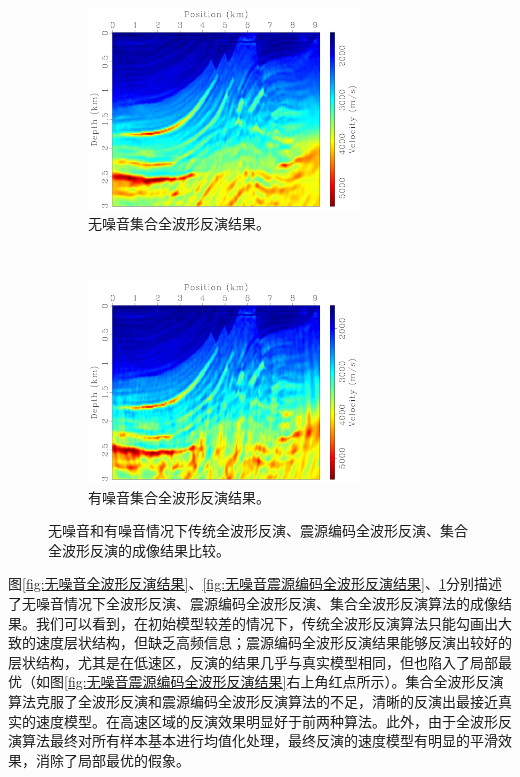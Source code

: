 \documentclass[degree=doctor]{thuthesis}
\begin{document}
\begin{figure}[ht]
    \begin{subfigure}[b]{0.5\textwidth}
        \centering
        \includegraphics[height=2.1in]{enfwi.pdf}
        \caption{无噪音集合全波形反演结果。}
        \label{fig:无噪音集合全波形反演结果}
    \end{subfigure}%
    ~
    \begin{subfigure}[b]{0.5\textwidth}
        \centering
        \includegraphics[height=2.1in]{enfwi-noise.pdf}
        \caption{有噪音集合全波形反演结果。}
        \label{fig:有噪音集合全波形反演结果}
    \end{subfigure}
    \caption{无噪音和有噪音情况下传统全波形反演、震源编码全波形反演、集合全波形反演的成像结果比较。}
\end{figure}

图\ref{fig:无噪音全波形反演结果}、\ref{fig:无噪音震源编码全波形反演结果}、\ref{fig:无噪音集合全波形反演结果}分别描述了无噪音情况下全波形反演、震源编码全波形反演、集合全波形反演算法的成像结果。我们可以看到，在初始模型较差的情况下，传统全波形反演算法只能勾画出大致的速度层状结构，但缺乏高频信息；震源编码全波形反演结果能够反演出较好的层状结构，尤其是在低速区，反演的结果几乎与真实模型相同，但也陷入了局部最优（如图\ref{fig:无噪音震源编码全波形反演结果}右上角红点所示）。集合全波形反演算法克服了全波形反演和震源编码全波形反演算法的不足，清晰的反演出最接近真实的速度模型。在高速区域的反演效果明显好于前两种算法。此外，由于全波形反演算法最终对所有样本基本进行均值化处理，最终反演的速度模型有明显的平滑效果，消除了局部最优的假象。
\end{document}

